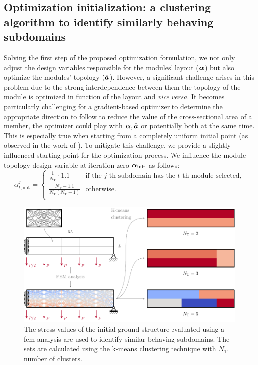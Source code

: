 \subsection{Optimization initialization: a clustering algorithm to identify similarly behaving subdomains}
Solving the first step of the proposed optimization formulation, we not only adjust the design variables responsible for the modules' layout ($\bm{\alpha}$) but also optimize the modules' topology $(\bar{\bm{a}}$). However, a significant challenge arises in this problem due to the strong interdependence between them \ie the topology of the module is optimized in function of the layout and \textit{vice versa}. It becomes particularly challenging for a gradient-based optimizer to determine the appropriate direction to follow \eg to reduce the value of the cross-sectional area of a member, the optimizer could play with $\bm{\alpha}, \bar{\bm{a}}$ or potentially both at the same time. This is especially true when starting from a completely uniform initial point (as observed in the work of ). To mitigate this challenge, we provide a slightly influenced starting point for the optimization process. We influence the module topology design variable at iteration zero $\bm{\alpha}_\text{init}$ as follows:
\begin{equation}
    \alpha_{t,\text{init}}^j =
    \begin{cases}
        \frac{1}{N_\text{T}} \cdot 1.1  & \text{if the $j$-th subdomain has the $t$-th module selected,}\\
        \frac{N_\text{T} - 1.1}{N_\text{T}(N_\text{T} - 1)} & \text{otherwise.} \\
    \end{cases}  
\end{equation}

\begin{figure}
    \centering
    \includegraphics{figures/06_DMO/00_stress_clustering/stress_clustering.pdf}
    \caption{The stress values of the initial ground structure evaluated using a \gls{fem} analysis are used to identify similar behaving subdomains. The sets are calculated using the k-means clustering technique with $N_\text{T}$ number of clusters.}
    \label{fig:06_kmeans}
\end{figure}

